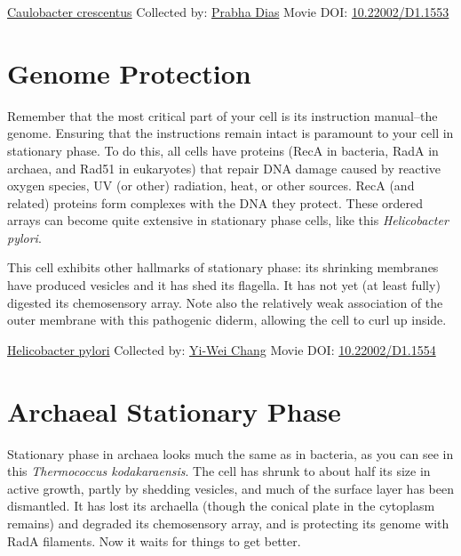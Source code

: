\documentclass[]{tufte-book}
\begin{document}
\hypertarget{htmlwidget-72e3e7041ede362d735e}{}

\label{fig:8-1}\protect\hyperlink{tree}{Caulobacter crescentus} Collected by: \protect\hyperlink{prabha_dias}{Prabha Dias} Movie DOI: \href{https://doi.org/10.22002/D1.1553}{10.22002/D1.1553}

\hypertarget{genome-protection}{%
\section{Genome Protection}\label{genome-protection}}

Remember that the most critical part of your cell is its instruction manual--the genome. Ensuring that the instructions remain intact is paramount to your cell in stationary phase. To do this, all cells have proteins (RecA in bacteria, RadA in archaea, and Rad51 in eukaryotes) that repair DNA damage caused by reactive oxygen species, UV (or other) radiation, heat, or other sources. RecA (and related) proteins form complexes with the DNA they protect. These ordered arrays can become quite extensive in stationary phase cells, like this \emph{Helicobacter pylori}.

This cell exhibits other hallmarks of stationary phase: its shrinking membranes have produced vesicles and it has shed its flagella. It has not yet (at least fully) digested its chemosensory array. Note also the relatively weak association of the outer membrane with this pathogenic diderm, allowing the cell to curl up inside.



\hypertarget{htmlwidget-ac9c69847cf65ace42de}{}

\label{fig:8-2}\protect\hyperlink{tree}{Helicobacter pylori} Collected by: \protect\hyperlink{yi-wei_chang}{Yi-Wei Chang} Movie DOI: \href{https://doi.org/10.22002/D1.1554}{10.22002/D1.1554}

\hypertarget{archaeal-stationary-phase}{%
\section{Archaeal Stationary Phase}\label{archaeal-stationary-phase}}

Stationary phase in archaea looks much the same as in bacteria, as you can see in this \emph{Thermococcus kodakaraensis}. The cell has shrunk to about half its size in active growth, partly by shedding vesicles, and much of the surface layer has been dismantled. It has lost its archaella (though the conical plate in the cytoplasm remains) and degraded its chemosensory array, and is protecting its genome with RadA filaments. Now it waits for things to get better.
\end{document}
